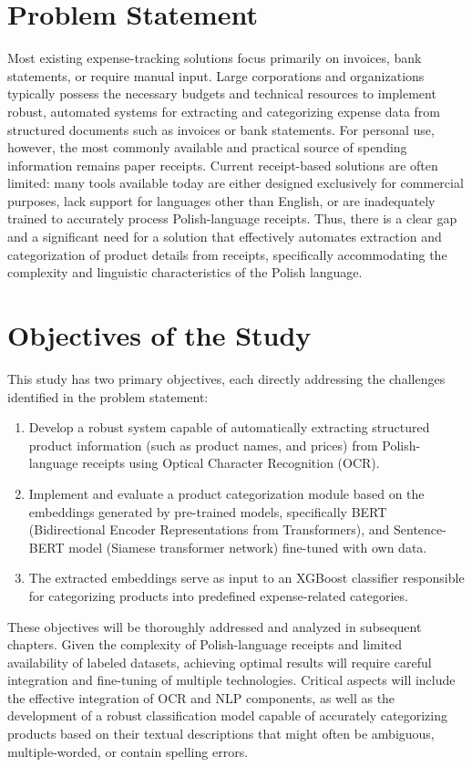 \documentclass{SGGW-thesis-EN}
\begin{document}
\section{Problem Statement}
Most existing expense-tracking solutions focus primarily on invoices, bank statements, or require manual input. 
Large corporations and organizations typically possess the necessary budgets and technical resources to implement robust, 
automated systems for extracting and categorizing expense data from structured documents such as invoices or bank statements. 
For personal use, however, the most commonly available and practical source of spending information remains paper receipts. 
Current receipt-based solutions are often limited: many tools available today are either designed exclusively for commercial purposes, 
lack support for languages other than English, or are inadequately trained to accurately process Polish-language receipts.  
Thus, there is a clear gap and a significant need for a solution that effectively automates extraction and categorization of product details from receipts, 
specifically accommodating the complexity and linguistic characteristics of the Polish language.

\section{Objectives of the Study}
This study has two primary objectives, each directly addressing the challenges identified in the problem statement:

\begin{enumerate} 
  \item Develop a robust system capable of automatically extracting structured product information (such as product names, and prices) from Polish-language receipts using Optical Character Recognition (OCR).
  \item Implement and evaluate a product categorization module based on the embeddings generated by pre-trained models, specifically BERT (Bidirectional Encoder Representations from Transformers),
  and Sentence-BERT model (Siamese transformer network) fine-tuned with own data. 
  \item The extracted embeddings serve as input to an XGBoost classifier responsible for categorizing products into predefined expense-related categories.
\end{enumerate}

These objectives will be thoroughly addressed and analyzed in subsequent chapters. 
Given the complexity of Polish-language receipts and limited availability of labeled datasets, achieving optimal results will require careful integration and fine-tuning of multiple technologies. 
Critical aspects will include the effective integration of OCR and NLP components, as well as the development of a robust classification model capable of accurately categorizing products based on their textual descriptions that might
often be ambiguous, multiple-worded, or contain spelling errors.
\newpage
\end{document}
